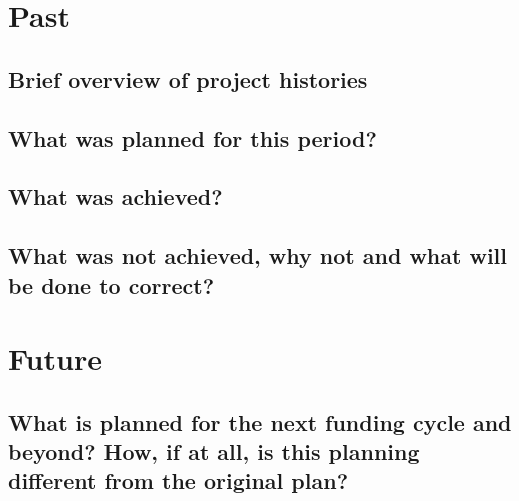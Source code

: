 \documentclass{article}
\begin{document}
%
%

\newpage
\tableofcontents

\renewcommand{\baselinestretch}{1.02}
\newpage
%
\section{Past}
\subsection{Brief overview of project histories}








\subsection{What was planned for this period?} 







%
\subsection{What was achieved?} 


%




%
\subsection{What was not achieved, why not and what will be done to correct?} 








\section{Future}
\subsection[What is planned for the next funding cycle and beyond?]{What is planned for the next funding cycle and beyond? How, if at all, is this planning different from the original plan?}







\end{document}
